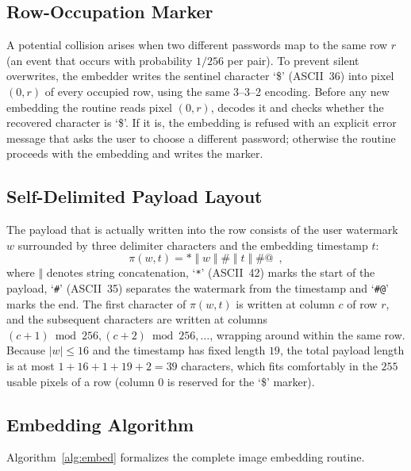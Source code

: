 \subsection{Row-Occupation Marker}

A potential collision arises when two different passwords map to the same row $r$ (an event that occurs with probability $1/256$ per pair). To prevent silent overwrites, the embedder writes the sentinel character `\$' (ASCII~36) into pixel $(0, r)$ of every occupied row, using the same 3--3--2 encoding. Before any new embedding the routine reads pixel $(0, r)$, decodes it and checks whether the recovered character is `\$'. If it is, the embedding is refused with an explicit error message that asks the user to choose a different password; otherwise the routine proceeds with the embedding and writes the marker.

\subsection{Self-Delimited Payload Layout}

The payload that is actually written into the row consists of the user watermark $w$ surrounded by three delimiter characters and the embedding timestamp $t$:
\begin{equation}
    \pi(w, t) = \mathtt{*} \;\Vert\; w \;\Vert\; \mathtt{\#} \;\Vert\; t \;\Vert\; \mathtt{\#@} \enspace ,
\end{equation}
where $\Vert$ denotes string concatenation, `\texttt{*}' (ASCII~42) marks the start of the payload, `\texttt{\#}' (ASCII~35) separates the watermark from the timestamp and `\texttt{\#@}' marks the end. The first character of $\pi(w, t)$ is written at column $c$ of row $r$, and the subsequent characters are written at columns $(c+1) \bmod 256, (c+2) \bmod 256, \ldots$, wrapping around within the same row. Because $|w| \le 16$ and the timestamp has fixed length $19$, the total payload length is at most $1 + 16 + 1 + 19 + 2 = 39$ characters, which fits comfortably in the $255$ usable pixels of a row (column $0$ is reserved for the `\$' marker).

\subsection{Embedding Algorithm}

Algorithm~\ref{alg:embed} formalizes the complete image embedding routine.


